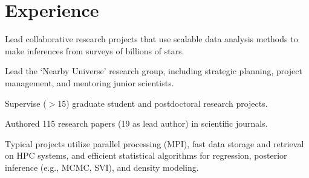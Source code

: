 \documentclass[letterpaper,12pt]{deedy-resume}
\begin{document}
\begin{minipage}[t]{0.64\textwidth} %


\section{Experience}


\vspace{1.5\topsep} %
\begin{tightitemize}
    \item Lead collaborative research projects that use scalable data analysis methods to make inferences from surveys of billions of stars.
    \item Lead the `Nearby Universe' research group, including strategic planning, project management, and mentoring junior scientists.
    \item Supervise ($>$15) graduate student and postdoctoral research projects.
    \item Authored 115 research papers (19 as lead author) in scientific journals.
    \item Typical projects utilize parallel processing (MPI), fast data storage and retrieval on HPC systems, and efficient statistical algorithms for regression, posterior inference (e.g., MCMC, SVI), and density modeling.
\end{tightitemize}

\sectionspace %



\end{minipage}
\end{document}
